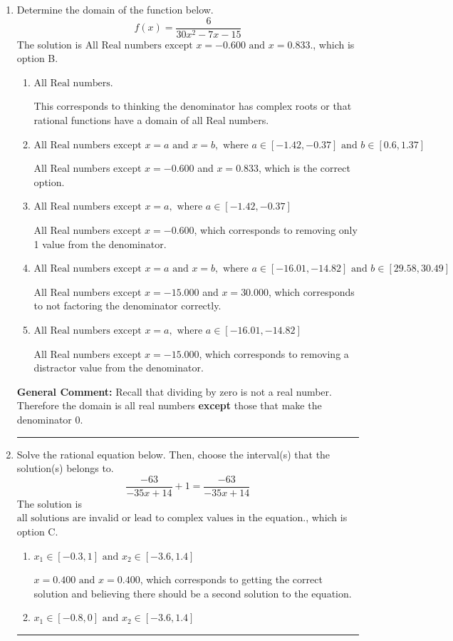 \documentclass{extbook}[14pt]
\newcommand{\litem}[1]{\item #1

\rule{\textwidth}{0.4pt}}
\begin{document}
\begin{enumerate}\litem{
Determine the domain of the function below.
\[ f(x) = \frac{6}{30x^{2} -7 x -15} \]The solution is \( \text{All Real numbers except } x = -0.600 \text{ and } x = 0.833. \), which is option B.\begin{enumerate}[label=\Alph*.]
\item \( \text{All Real numbers.} \)

This corresponds to thinking the denominator has complex roots or that rational functions have a domain of all Real numbers.
\item \( \text{All Real numbers except } x = a \text{ and } x = b, \text{ where } a \in [-1.42, -0.37] \text{ and } b \in [0.6, 1.37] \)

All Real numbers except $x = -0.600$ and $x = 0.833$, which is the correct option.
\item \( \text{All Real numbers except } x = a, \text{ where } a \in [-1.42, -0.37] \)

All Real numbers except $x = -0.600$, which corresponds to removing only 1 value from the denominator.
\item \( \text{All Real numbers except } x = a \text{ and } x = b, \text{ where } a \in [-16.01, -14.82] \text{ and } b \in [29.58, 30.49] \)

All Real numbers except $x = -15.000$ and $x = 30.000$, which corresponds to not factoring the denominator correctly.
\item \( \text{All Real numbers except } x = a, \text{ where } a \in [-16.01, -14.82] \)

All Real numbers except $x = -15.000$, which corresponds to removing a distractor value from the denominator.
\end{enumerate}

\textbf{General Comment:} Recall that dividing by zero is not a real number. Therefore the domain is all real numbers \textbf{except} those that make the denominator 0.
}
\litem{
Solve the rational equation below. Then, choose the interval(s) that the solution(s) belongs to.
\[ \frac{-63}{-35x + 14} + 1 = \frac{-63}{-35x + 14} \]The solution is \( \text{all solutions are invalid or lead to complex values in the equation.} \), which is option C.\begin{enumerate}[label=\Alph*.]
\item \( x_1 \in [-0.3, 1] \text{ and } x_2 \in [-3.6,1.4] \)

$x = 0.400 \text{ and } x = 0.400$, which corresponds to getting the correct solution and believing there should be a second solution to the equation.
\item \( x_1 \in [-0.8, 0] \text{ and } x_2 \in [-3.6,1.4] \)


\end{enumerate}}
\end{enumerate}
\end{document}
